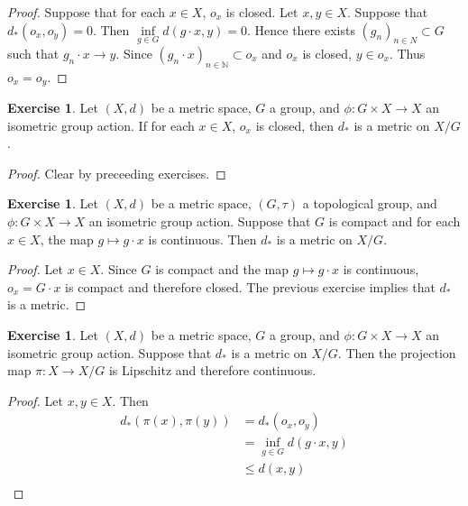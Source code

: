 \documentclass[12pt]{amsart}
\theoremstyle{definition}
\newtheorem{ex}[definition]{Exercise}
\newcommand{\N}{\mathbb{N}}
\newcommand{\lex}[1]{\label{ex:#1}}
\begin{document}
	\begin{proof}
	Suppose that for each $x \in X$, $o_x$ is closed. Let $x,y \in X$. Suppose that $d_*(o_x , o_y) = 0$. Then $\inf\limits_{ g \in G} d(g \cdot x, y) = 0$. Hence there exists $(g_n)_{n \in N} \subset G$ such that $g_n \cdot x \rightarrow y$. Since $(g_n \cdot x)_{n \in \N} \subset o_x$ and $o_x$ is closed, $y \in o_x$. Thus $o_x = o_y$. 
	\end{proof}
	
	\begin{ex} \lex{}
	Let $(X, d)$ be a metric space, $G$ a group, and $\phi: G \times X \rightarrow X$ an isometric group action. If for each $x \in X$, $o_x$ is closed, then $d_*$ is a metric on $X/G$.
	\end{ex}
	
	\begin{proof}
	Clear by preceeding exercises.
	\end{proof}
	
	\begin{ex} \lex{}
	Let $(X, d)$ be a metric space, $(G, \tau)$ a topological group, and $\phi: G \times X \rightarrow X$ an isometric group action. Suppose that $G$ is compact and for each $x \in X$, the map $g \mapsto g \cdot x$ is continuous. Then $d_*$ is a metric on $X/G$. 
	\end{ex}
	
	\begin{proof}
	Let $x \in X$. Since $G$ is compact and the map $g \mapsto g \cdot x$ is continuous, $o_x = G \cdot x$ is compact and therefore closed. The previous exercise implies that $d_*$ is a metric.
	\end{proof}
	
	\begin{ex} \lex{}
	Let $(X, d)$ be a metric space, $G$ a group, and $\phi: G \times X \rightarrow X$ an isometric group action. Suppose that $d_*$ is a metric on $X/G$. Then the projection map $\pi: X \rightarrow X/G$ is Lipschitz and therefore continuous.
	\end{ex}
	
	\begin{proof}
	Let $x,y \in X$. Then
	\begin{align*}
	d_*(\pi(x), \pi(y)) 
	&= d_*(o_x, o_y) \\
	&= \inf_{g \in G} d(g \cdot x, y)\\
	& \leq d(x,y)  \\
	\end{align*}
	\end{proof}
	
\end{document}
